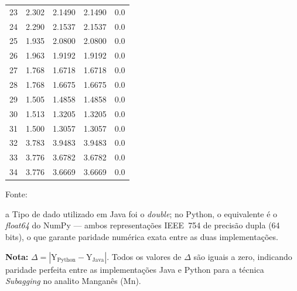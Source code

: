 \begin{table}[H]
\begin{threeparttable}
{\begin{tabular}{
    S[table-format=2.0]
    S[table-format=2.3]
    S[table-format=2.4]
    S[table-format=2.4]
    S[table-format=1.1]
}
23  &  2.302  &  2.1490  &  2.1490  & 0.0 \\
24  &  2.290  &  2.1537  &  2.1537  & 0.0 \\
25  &  1.935  &  2.0800  &  2.0800  & 0.0 \\
26  &  1.963  &  1.9192  &  1.9192  & 0.0 \\
27  &  1.768  &  1.6718  &  1.6718  & 0.0 \\
28  &  1.768  &  1.6675  &  1.6675  & 0.0 \\
29  &  1.505  &  1.4858  &  1.4858  & 0.0 \\
30  &  1.513  &  1.3205  &  1.3205  & 0.0 \\
31  &  1.500  &  1.3057  &  1.3057  & 0.0 \\
32  &  3.783  &  3.9483  &  3.9483  & 0.0 \\
33  &  3.776  &  3.6782  &  3.6782  & 0.0 \\
34  &  3.776  &  3.6669  &  3.6669  & 0.0 \\
\bottomrule
\end{tabular}%
}
\begin{center}
\begin{minipage}{0.85\linewidth}
\begin{tablenotes}
\footnotesize
\item Fonte:~\oautor
\item[a] Tipo de dado utilizado em Java foi o \textit{double}; no Python,
o equivalente é o \textit{float64} do NumPy — ambos representações IEEE~754
de precisão dupla (64 bits), o que garante paridade numérica exata entre as
duas implementações.
\item \textbf{Nota:} $\Delta = |\text{Y}_{\text{Python}} - \text{Y}_{\text{Java}}|$.
Todos os valores de $\Delta$ são iguais a zero, indicando paridade
perfeita entre as implementações Java e Python para a técnica \textit{Subagging}
no analito Manganês (Mn).
\end{tablenotes}
\end{minipage}
\end{center}
\end{threeparttable}
\end{table}

